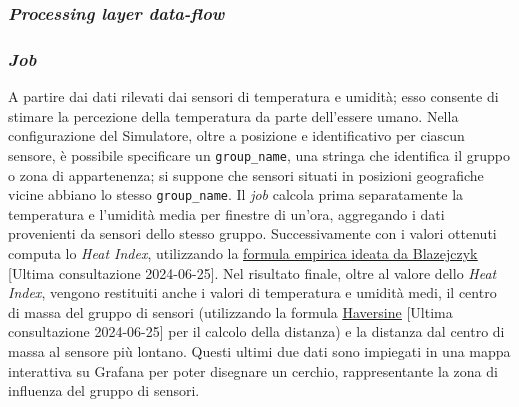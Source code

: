 \subsubsection{\textit{Processing layer data-flow}}

\subsubsection{\textit{Job}}
A partire dai dati rilevati dai sensori di temperatura e umidità; esso consente di stimare la percezione della temperatura da parte dell'essere umano.
Nella configurazione del Simulatore, oltre a posizione e identificativo per ciascun sensore, è possibile specificare un \texttt{group\_name}, una stringa che identifica il gruppo o zona di appartenenza;
si suppone che sensori situati in posizioni geografiche vicine abbiano lo stesso \texttt{group\_name}. Il \textit{job} calcola prima separatamente
la temperatura e l'umidità media per finestre di un'ora, aggregando i dati provenienti da sensori dello stesso gruppo. Successivamente con i valori ottenuti computa lo \textit{Heat Index},
utilizzando la \underline{\href{https://www.ncbi.nlm.nih.gov/pmc/articles/PMC3801457/}{formula empirica ideata da Blazejczyk}} [Ultima consultazione 2024-06-25].
Nel risultato finale, oltre al valore dello \textit{Heat Index}, vengono restituiti anche i valori di temperatura e umidità medi, il centro di massa del gruppo di sensori
(utilizzando la formula \underline{\href{https://en.wikipedia.org/wiki/Haversine_formula}{Haversine}} [Ultima consultazione 2024-06-25] per il calcolo della distanza) e la
distanza dal centro di massa al sensore più lontano. Questi ultimi due dati sono impiegati in una mappa interattiva su Grafana per poter disegnare un cerchio, rappresentante la zona di influenza del gruppo di sensori.

